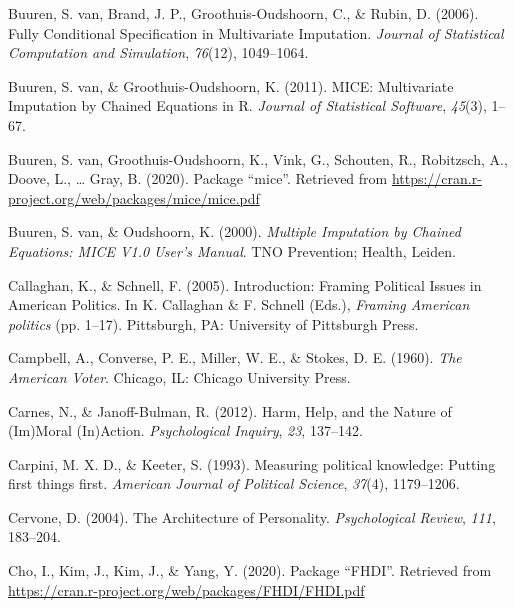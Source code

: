 \documentclass[12pt,econ]{sources/authesis}
\newenvironment{CSLReferences}%
  {}%
  {\par}
\begin{document}
\begin{CSLReferences}{1}{0}
\leavevmode{}%
Buuren, S. van, Brand, J. P., Groothuis-Oudshoorn, C., \& Rubin, D. (2006). {Fully Conditional Specification in Multivariate Imputation}. \emph{Journal of Statistical Computation and Simulation}, \emph{76}(12), 1049--1064.

\leavevmode{}%
Buuren, S. van, \& Groothuis-Oudshoorn, K. (2011). {MICE: Multivariate Imputation by Chained Equations in R}. \emph{Journal of Statistical Software}, \emph{45}(3), 1--67.

\leavevmode{}%
Buuren, S. van, Groothuis-Oudshoorn, K., Vink, G., Schouten, R., Robitzsch, A., Doove, L., \ldots{} Gray, B. (2020). {Package {``mice''}}. Retrieved from \url{https://cran.r-project.org/web/packages/mice/mice.pdf}

\leavevmode{}%
Buuren, S. van, \& Oudshoorn, K. (2000). \emph{{Multiple Imputation by Chained Equations: MICE V1.0 User's Manual}}. TNO Prevention; Health, Leiden.

\leavevmode{}%
Callaghan, K., \& Schnell, F. (2005). Introduction: {Framing} {Political} {Issues} in {American} {Politics}. In K. Callaghan \& F. Schnell (Eds.), \emph{Framing {American} politics} (pp. 1--17). Pittsburgh, PA: University of Pittsburgh Press.

\leavevmode{}%
Campbell, A., Converse, P. E., Miller, W. E., \& Stokes, D. E. (1960). \emph{The {American} {Voter}}. Chicago, IL: Chicago University Press.

\leavevmode{}%
Carnes, N., \& Janoff-Bulman, R. (2012). {Harm, Help, and the Nature of (Im)Moral (In)Action}. \emph{Psychological Inquiry}, \emph{23}, 137--142.

\leavevmode{}%
Carpini, M. X. D., \& Keeter, S. (1993). Measuring political knowledge: Putting first things first. \emph{American Journal of Political Science}, \emph{37}(4), 1179--1206.

\leavevmode{}%
Cervone, D. (2004). {The Architecture of Personality}. \emph{Psychological Review}, \emph{111}, 183--204.

\leavevmode{}%
Cho, I., Kim, J., Kim, J., \& Yang, Y. (2020). {Package {``FHDI''}}. Retrieved from \url{https://cran.r-project.org/web/packages/FHDI/FHDI.pdf}


\end{CSLReferences}
\end{document}
